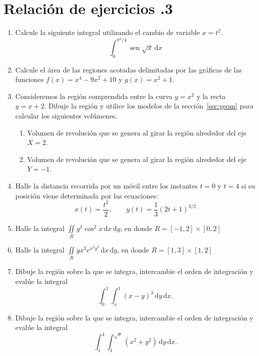 \section*{Relación de ejercicios \thechapter.3}

\pagestyle{relaciones}


\begin{enumerate}


\item
Calcule la siguiente integral utilizando el cambio de variable $x=t^2$.
\[
\displaystyle\int_0^{\pi^2/4}\operatorname{sen}\sqrt{x}\,\mathrm dx
\]

\item
Calcule el área de las regiones acotadas delimitadas por las gráficas de las funciones $f(x)=x^4-9x^2+10$ y
$g(x)=x^2+1$.


\item Consideremos la región comprendida entre la curva $y=x^2$ y la recta $y=x+2$.
Dibuje la región y utilice los modelos de la sección~\ref{sec:geom} para calcular los siguientes volúmenes.
\begin{enumerate}
\item Volumen de revolución que se genera al girar la región alrededor del eje $X=2$.
\item Volumen de revolución que se genera al girar la región alrededor del eje $Y=-1$.
\end{enumerate}


\item Halle la distancia recorrida por un móvil entre los instantes $t=0$ y $t=4$ si su posición viene determinada por las ecuaciones:
$$ x(t)=\frac{t^2}{2},\qquad y(t)=\frac{1}{3}(2t+1)^{3/2} $$


\item
Halle la integral $\displaystyle\iint\limits_R y^3\cos^2x\,\mathrm dx\,\mathrm dy$, en donde
$R=[-1,2]\times [0,2]$

\item
Halle la integral $\displaystyle\iint\limits_R yx^3 e^{x^2y^2}\,\mathrm dx\,\mathrm dy$, en donde
$R=[1,3]\times [1,2]$


\item Dibuje la región sobre la que se integra, intercambie el orden de
integración y evalúe la integral 
\[
\int_0^1\int_x^1 (x-y)^3\,\mathrm dy\,\mathrm dx.
\]

\item Dibuje la región sobre la que se integra, intercambie el orden de
integración y evalúe la integral 
\[
\int_1^4\int_1^{\sqrt{x}} (x^2+y^2)\,\mathrm dy\,\mathrm dx.
\]

\end{enumerate}

